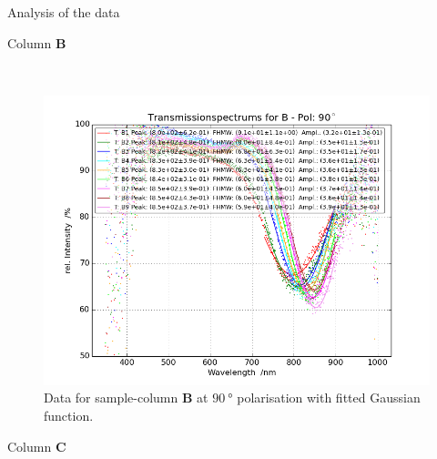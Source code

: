 \documentclass[pdftex, a4paper,11pt, twoside, UKenglish]{report}
\begin{document}
\begin{chapter}{Analysis of the data}
\begin{section}{Column \textbf{B}}
\begin{figure}[ht!]
\begin{minipage}{.95\textwidth}
          \label{fig:TransspecFIT_BPol0}
        \end{minipage}\\
        \begin{minipage}{.95\textwidth}
          \centering
          \includegraphics[width=\textwidth]
              {Figures/TransspecFIT_BPol90.png}
          \caption{Data for sample-column \textbf{B} at $\SI{90}{\degree}$
              polarisation with fitted Gaussian function.}
          \label{fig:TransspecFIT_BPol90}
        \end{minipage}
      \end{figure}
      
    \end{section}
    
    
    
    \newpage
    \begin{section}{Column \textbf{C}}
      \label{chp::DataC}
      
      

\end{section}
\end{chapter}
\end{document}
